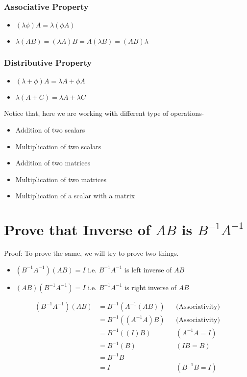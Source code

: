 \documentclass{article}
\begin{document}
\subsubsection{Associative Property}

\begin{itemize}
    \item \((\lambda\phi)A = \lambda(\phi A)\) 
    \item \(\lambda(AB) = (\lambda A)B = A(\lambda B) = (AB)\lambda \)
\end{itemize}

\subsubsection{Distributive Property}
\begin{itemize}
    \item \((\lambda + \phi)A = \lambda A + \phi A\)
    \item \(\lambda(A + C) = \lambda A + \lambda C\)
\end{itemize}

Notice that, here we are working with different type of operations-
\begin{itemize}
    \item Addition of two scalars
    \item Multiplication of two scalars
    \item Addition of two matrices
    \item Multiplication of two matrices    
    \item Multiplication of a scalar with a matrix
\end{itemize}

\section{Prove that Inverse of \(AB\) is \(B^{-1}A^{-1}\)}
Proof: To prove the same, we will try to prove two things.
\begin{itemize}
    \item \((B^{-1}A^{-1})(AB) = I\) i.e. \(B^{-1}A^{-1}\) is left inverse of \(AB\)
    \item \((AB)(B^{-1}A^{-1}) = I\) i.e. \(B^{-1}A^{-1}\) is right inverse of \(AB\)
\end{itemize}

\begin{align}
    (B^{-1}A^{-1}) (AB) & = B^{-1}(A^{-1}(AB)) && \text{(Associativity)} \nonumber\\
                        & = B^{-1}((A^{-1}A)B) && \text{(Associativity)} \nonumber\\
                        & = B^{-1}((I)B) && (A^{-1}A = I) \nonumber\\
                        & = B^{-1}(B)   && ( IB = B)\nonumber\\
                        & = B^{-1}B \nonumber\\
                        & = I && (B^{-1}B = I) \nonumber
\end{align}
\end{document}
